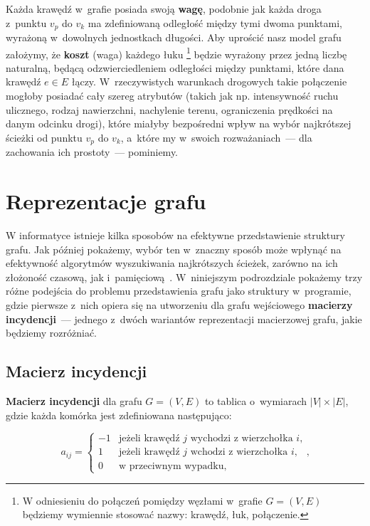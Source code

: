 Każda krawędź w~grafie posiada swoją \textbf{wagę}, podobnie jak każda droga z~punktu $v_{p}$ do $v_{k}$ ma zdefiniowaną odległość między tymi dwoma punktami, wyrażoną w~dowolnych jednostkach długości.
Aby uprościć nasz model grafu założymy, że \textbf{koszt} (waga) każdego łuku \footnote{W odniesieniu do połączeń pomiędzy węzłami w~grafie $G = \left( V, E \right) $ będziemy wymiennie stosować nazwy: krawędź, łuk, połączenie.} będzie wyrażony przez jedną liczbę naturalną, będącą odzwierciedleniem odległości między punktami, które dana krawędź $e \in E$ łączy.
W~rzeczywistych warunkach drogowych takie połączenie mogłoby posiadać cały szereg atrybutów (takich jak np. intensywność ruchu ulicznego, rodzaj nawierzchni, nachylenie terenu, ograniczenia prędkości na danym odcinku drogi), które miałyby bezpośredni wpływ na wybór najkrótszej ścieżki od punktu $v_{p}$ do $v_{k}$, a~które my w~swoich rozważaniach~---  dla zachowania ich prostoty~---  pominiemy.


\section{Reprezentacje grafu}


W informatyce istnieje kilka sposobów na efektywne przedstawienie struktury grafu.
Jak później pokażemy, wybór ten w~znaczny sposób może wpłynąć na efektywność algorytmów wyszukiwania najkrótszych ścieżek, zarówno na ich złożoność czasową, jak i~pamięciową~\cite[$7$ -- $10$]{eCOMPASS_TR_005}.
W~niniejszym podrozdziale pokażemy trzy różne podejścia do problemu przedstawienia grafu jako struktury w~programie, gdzie pierwsze z~nich opiera się na utworzeniu dla grafu wejściowego \textbf{macierzy incydencji}~---  jednego z~dwóch wariantów reprezentacji macierzowej grafu, jakie będziemy rozróżniać.

\subsection{Macierz incydencji}

\textbf{Macierz incydencji} dla grafu $G = \left( V, E \right) $ to tablica o~wymiarach $\left| V \right| \times \left| E \right|$, gdzie każda komórka jest zdefiniowana następująco:

\begin{equation}
	a_{ij}= \left\{ 
	\begin{array}{ll}
	-1 & \textrm{jeżeli krawędź $j$ wychodzi z~wierzchołka $i$,}\\
	1 & \textrm{jeżeli krawędź $j$ wchodzi z~wierzchołka $i$,}\\
	0 & \textrm{w przeciwnym wypadku,}
	\end{array} \right.\textrm{,}
\end{equation}

